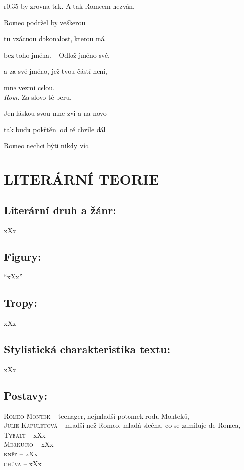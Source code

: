 \documentclass[A4paper]{extarticle} %
\begin{document}
\begin{wrapfigure}{r}{0.35\textwidth}
by zrovna tak. A tak Romeem nezván, \par
Romeo podržel by veškerou \par
tu vzácnou dokonalost, kterou má \par
bez toho jména. -- Odlož jméno své, \par
a za své jméno, jež tvou částí není, \par
mne vezmi celou. \\
\textit{Rom.} Za slovo tě beru. \par
Jen láskou svou mne zvi a na novo \par
tak budu pokřtěn; od té chvíle dál \par
Romeo nechci býti nikdy víc. 
\end{wrapfigure}

\section*{LITERÁRNÍ TEORIE}

\subsection*{Literární druh a žánr:}
\noindent xXx



\subsection*{Figury:}
\noindent 
\enquote{xXx}

\subsection*{Tropy:}
\noindent 
xXx

\subsection*{Stylistická charakteristika textu:}
\noindent 
xXx

\subsection*{Postavy:}
\noindent 
\textsc{Romeo Montek --} teenager, nejmladší potomek rodu Monteků,  \\
\textsc{Julie Kapuletová --} mladší než Romeo, mladá slečna, co se zamiluje do Romea, \\
\textsc{Tybalt --} xXx \\
\textsc{Merkucio --} xXx \\
\textsc{kněz --} xXx \\
\textsc{chůva --} xXx
\end{document}
